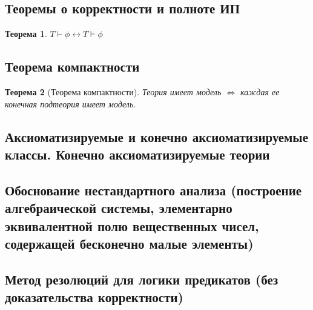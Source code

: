 \documentclass[a4paper]{article}
\newtheorem{theorem}{Теорема}[section]
\theoremstyle{definition}
\theoremstyle{remark}
\begin{document}
    \subsection{Теоремы о корректности и полноте ИП}
	\begin{theorem}
		$T \vdash \phi \leftrightarrow T \models \phi$ 
	\end{theorem}
    \subsection{Теорема компактности}
    \begin{theorem}[Теорема компактности]
        Теория имеет модель $\Leftrightarrow$ каждая ее конечная подтеория имеет модель. 
    \end{theorem}
    \subsection{Аксиоматизируемые и конечно аксиоматизируемые классы. Конечно аксиоматизируемые теории}
    \subsection{Обоснование нестандартного анализа (построение алгебраической системы, элементарно эквивалентной полю вещественных чисел, содержащей бесконечно малые элементы)}
    \subsection{Метод резолюций для логики предикатов (без доказательства корректности)}


\end{document}

